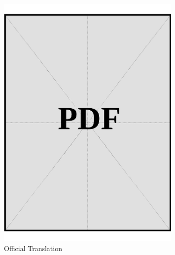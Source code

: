 \begin{figure}[ht]
  \centering
  \includegraphics[page=1, width=0.8\textwidth]{../application-docs/applicant/employment/company-2/insurance-records/official-translations.pdf}
  \caption{Official Translation}
  \label{pdf:company-2-insurance-official-translations}
\end{figure}

\clearpage

\vspace*{\fill}

